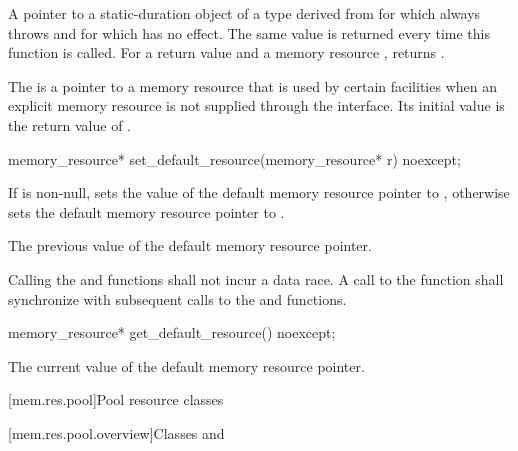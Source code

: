 \begin{itemdescr}
\pnum
\returns
A pointer to a static-duration object of a type derived from 
for which  always throws  and
for which  has no effect.
The same value is returned every time this function is called.
For a return value  and a memory resource ,
 returns .
\end{itemdescr}

\pnum
The  is a pointer to a memory resource
that is used by certain facilities when an explicit memory resource
is not supplied through the interface.
Its initial value is the return value of .

%
\begin{itemdecl}
memory_resource* set_default_resource(memory_resource* r) noexcept;
\end{itemdecl}

\begin{itemdescr}
\pnum
\effects
If  is non-null,
sets the value of the default memory resource pointer to ,
otherwise sets the default memory resource pointer to .

\pnum
\returns
The previous value of the default memory resource pointer.

\pnum
\remarks
Calling the  and
 functions shall not incur a data race.
A call to the  function
shall synchronize with subsequent calls to
the  and  functions.
\end{itemdescr}

%
\begin{itemdecl}
memory_resource* get_default_resource() noexcept;
\end{itemdecl}

\begin{itemdescr}
\pnum
\returns
The current value of the default memory resource pointer.
\end{itemdescr}

[mem.res.pool]{Pool resource classes}

[mem.res.pool.overview]{Classes  and }

